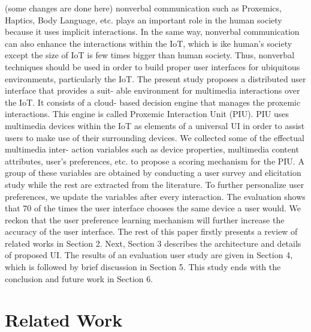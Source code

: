 \documentclass[runningheads,a4paper]{llncs}
\begin{document}
(some changes are done here)
nonverbal communication such as Proxemics, Haptics, Body Language, etc. plays an important role in the human society because it uses implicit interactions. In the same way, nonverbal communication can also enhance the interactions within the IoT, which is ike human’s society except the size of IoT is few times bigger than human society. Thus, nonverbal techniques should be used in order to build proper user interfaces for ubiquitous environments, particularly the IoT. 
\newline
\newline
The present study proposes a distributed user interface that provides a suit- able environment for multimedia interactions over the IoT. It consists of a cloud- based decision engine that manages the proxemic interactions. This engine is called Proxemic Interaction Unit (PIU). PIU uses multimedia devices within the IoT as elements of a universal UI in order to assist users to make use of their surrounding devices. We collected some of the effectual multimedia inter- action variables such as device properties, multimedia content attributes, user’s preferences, etc. to propose a scoring mechanism for the PIU. A group of these variables are obtained by conducting a user survey and elicitation study while the rest are extracted from the literature. To further personalize user preferences, we update the variables after every interaction. The evaluation shows that 70  of the times the user interface chooses the same device a user would. We reckon that the user preference learning mechanism will further increase the accuracy of the user interface. 
\newline
The rest of this paper firstly presents a review of related works in Section 2. Next, Section 3 describes the architecture and details of proposed UI. The results of an evaluation user study are given in Section 4, which is followed by brief discussion in Section 5. This study ends with the conclusion and future work in Section 6. 





\section{Related Work }
\end{document}
